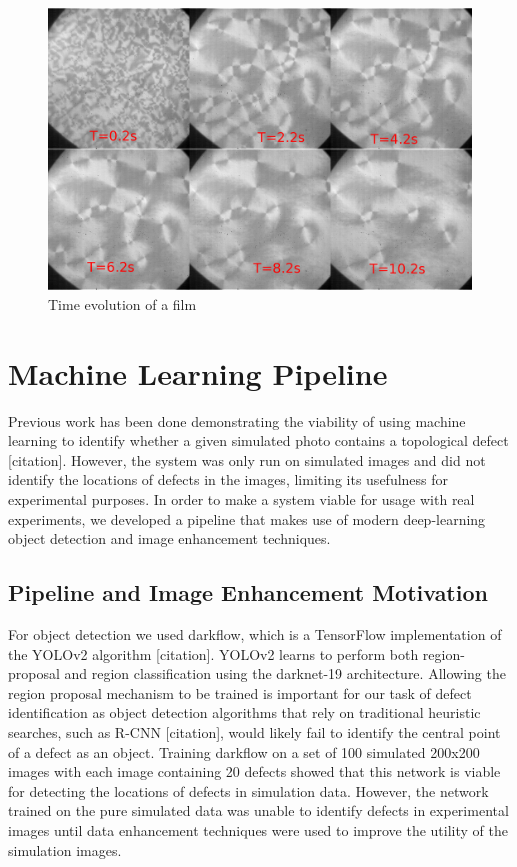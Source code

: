 \documentclass[prl,reprint,showpacs,floatfix,nofootinbib]{revtex4-1}
\begin{document}
\begin{figure}
  \includegraphics[width=\linewidth]{film.png}
  \caption{Time evolution of a film}
  \label{fig:frames}
\end{figure}

\section{Machine Learning Pipeline}

Previous work has been done demonstrating the viability of using machine learning to identify whether a given simulated photo contains a topological defect [citation]. However, the system was only run on simulated images and did not identify the locations of defects in the images, limiting its usefulness for experimental purposes. In order to make a system viable for usage with real experiments, we developed a pipeline that makes use of modern deep-learning object detection and image enhancement techniques. 

\subsection{Pipeline and Image Enhancement Motivation}

For object detection we used darkflow, which is a TensorFlow implementation of the YOLOv2 algorithm [citation]. YOLOv2 learns to perform both region-proposal and region classification using the darknet-19 architecture. Allowing the region proposal mechanism to be trained is important for our task of defect identification as object detection algorithms that rely on traditional heuristic searches, such as R-CNN [citation], would likely fail to identify the central point of a defect as an object. Training darkflow on a set of 100 simulated 200x200 images with each image containing 20 defects showed that this network is viable for detecting the locations of defects in simulation data. However, the network trained on the pure simulated data was unable to identify defects in experimental images until data enhancement techniques were used to improve the utility of the simulation images.
\end{document}
